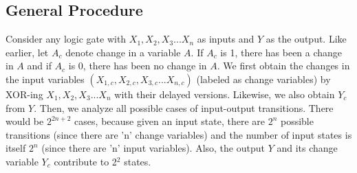 \documentclass[10pt,journal,cspaper,compsoc]{IEEEtran}
\begin{document}
\subsection{General Procedure}
{Consider any logic gate with $X_1, X_2, X_3...X_n$ as inputs and $Y$ as the output. Like earlier, let $A_c$ denote change in a variable $A$. If $A_c$ is 1, there has been a change in $A$ and if $A_c$ is 0, there has been no change in $A$. We first obtain the changes in the input variables $(X_{1,c}, X_{2,c}, X_{3,c}...X_{n,c})$ (labeled as change variables) by XOR-ing $X_1, X_2, X_3...X_n$ with their delayed versions. Likewise, we also obtain $Y_c$ from $Y$. Then, we analyze all possible cases of input-output transitions. There would be $2^{2n+2}$ cases, because given an input state, there are $2^n$ possible transitions (since there are 'n' change variables) and the number of input states is itself $2^n$ (since there are 'n' input variables). Also, the output $Y$ and its change variable $Y_c$ contribute to 2$^2$ states.}
\end{document}
